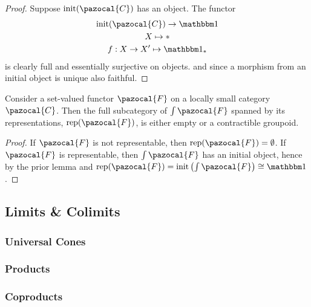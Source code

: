 \begin{proof}
    Suppose $\mathrm{init}(\pazocal{C})$ has an object. The functor 
    \begin{gather*}
        \mathrm{init}(\pazocal{C})\rightarrow \fone\\
        X\mapsto \ast\\
        f: X\rightarrow X' \mapsto \fone_\ast
    \end{gather*} 
    is clearly full and essentially surjective on objects. and since a morphism from an initial object is unique also faithful. 
\end{proof}
\begin{proposition}
    Consider a set-valued functor $\pazocal{F}$ on a locally small category $\pazocal{C}$. Then the full subcategory of $\int\pazocal{F}$ spanned by its representations, $\mathrm{rep}(\pazocal{F})$, is either empty or a contractible groupoid. 
\end{proposition}
\begin{proof}
    If $\pazocal{F}$ is not representable, then $\mathrm{rep}(\pazocal{F})= \emptyset$. If $\pazocal{F}$ is representable, then $\int\pazocal{F}$ has an initial object, hence by the prior lemma and $\mathrm{rep}(\pazocal{F})=\mathrm{init}\left(\int\pazocal{F}\right) \cong \fone$.
\end{proof}
\subsection{Limits \& Colimits}
\subsubsection{Universal Cones}
\subsubsection{Products}
\subsubsection{Coproducts}